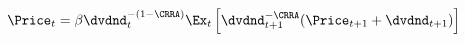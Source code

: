 \begin{equation}\begin{gathered}\begin{aligned}
 \Price_{t} & =  \beta \dvdnd_{t}^{-(1-\CRRA)} \Ex_{t}\left[\dvdnd_{t+1}^{-\CRRA}(\Price_{t+1}+\dvdnd_{t+1})\right] \label{eq:pofdCRRAWdvdndGro}
\end{aligned}\end{gathered}\end{equation}
